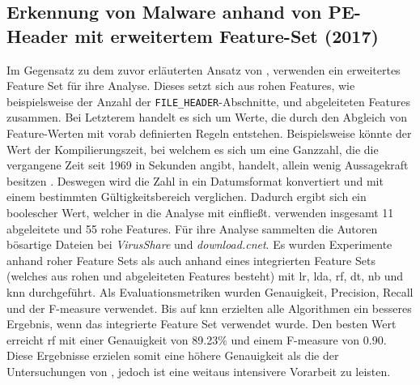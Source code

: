 \documentclass[
    12pt, %
    DIV10,
    ngerman, %
    a4paper, %
    oneside, %
    titlepage, %
    parskip=half, %
    headings=normal, %
    listof=totoc, %
    bibliography=totoc, %
    index=totoc, %
    captions=tableheading, %
    final %
]{scrreprt}
\begin{document}
\subsection{Erkennung von Malware anhand von PE-Header mit erweitertem  Feature-Set (2017)}
Im Gegensatz zu dem zuvor erläuterten Ansatz  von \textcite{Raff2017}, verwenden \textcite{Kumar2017} ein erweitertes Feature Set für ihre Analyse. Dieses setzt sich aus rohen Features, wie beispielsweise der Anzahl der \texttt{FILE\_HEADER}-Abschnitte, und abgeleiteten Features zusammen. Bei Letzterem handelt es sich um Werte, die durch den Abgleich von Feature-Werten mit vorab definierten Regeln entstehen. Beispielsweise könnte der Wert der Kompilierungszeit, bei welchem es sich um eine Ganzzahl, die die vergangene Zeit seit 1969 in Sekunden angibt, handelt, allein wenig Aussagekraft besitzen \parencite{Kumar2017}. Deswegen wird die Zahl in ein Datumsformat konvertiert und mit einem bestimmten Gültigkeitsbereich verglichen. Dadurch ergibt sich ein boolescher Wert, welcher in die Analyse mit einfließt. \textcite{Kumar2017} verwenden insgesamt 11 abgeleitete und 55 rohe Features. Für ihre Analyse sammelten die Autoren bösartige Dateien bei \emph{VirusShare} und \emph{download.cnet}. Es wurden Experimente anhand  roher Feature Sets als auch anhand eines integrierten Feature Sets (welches aus rohen und abgeleiteten Features besteht) mit \ac{lr}, \ac{lda}, \ac{rf}, \ac{dt}, \ac{nb} und \ac{knn} durchgeführt. Als Evaluationsmetriken wurden Genauigkeit, Precision, Recall und der F-measure verwendet. Bis auf \ac{knn} erzielten alle Algorithmen ein besseres Ergebnis, wenn das integrierte Feature Set verwendet wurde. Den besten Wert erreicht \ac{rf} mit einer Genauigkeit von 89.23\% und einem F-measure von 0.90. \\
Diese Ergebnisse erzielen somit eine höhere Genauigkeit als die der Untersuchungen von \textcite{Raff2017}, jedoch ist eine weitaus intensivere Vorarbeit zu leisten.
%
\end{document}
